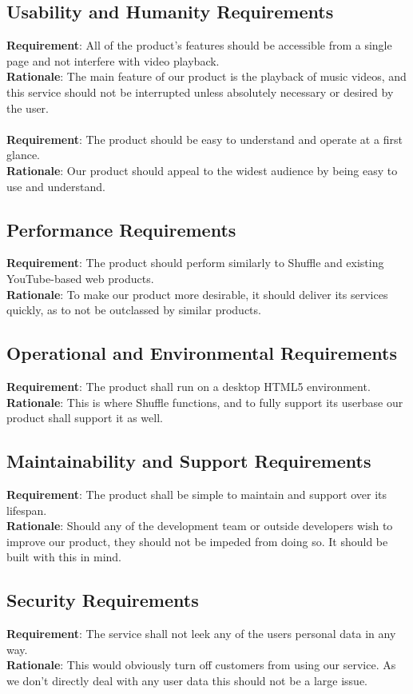 \documentclass[12pt, titlepage]{article}
\begin{document}
\subsection{Usability and Humanity Requirements}
\textbf{Requirement}: All of the product's features should be accessible from a single page and not interfere with video playback.\\
\textbf{Rationale}: The main feature of our product is the playback of music videos, and this service should not be interrupted unless absolutely necessary or desired by the user.\\\\
\textbf{Requirement}: The product should be easy to understand and operate at a first glance.\\
\textbf{Rationale}: Our product should appeal to the widest audience by being easy to use and understand.

\subsection{Performance Requirements}
\textbf{Requirement}: The product should perform similarly to Shuffle and existing YouTube-based web products.\\
\textbf{Rationale}: To make our product more desirable, it should deliver its services quickly, as to not be outclassed by similar products.

\subsection{Operational and Environmental Requirements}
\textbf{Requirement}: The product shall run on a desktop HTML5 environment.\\
\textbf{Rationale}: This is where Shuffle functions, and to fully support its userbase our product shall support it as well.

\subsection{Maintainability and Support Requirements}
\textbf{Requirement}: The product shall be simple to maintain and support over its lifespan.\\
\textbf{Rationale}: Should any of the development team or outside developers wish to improve our product, they should not be impeded from doing so.  It should be built with this in mind.

\subsection{Security Requirements}
\textbf{Requirement}: The service shall not leek any of the users personal data in any way.\\
\textbf{Rationale}: This would obviously turn off customers from using our service. As we don't directly deal with any user data this should not be a large issue.
\end{document}
